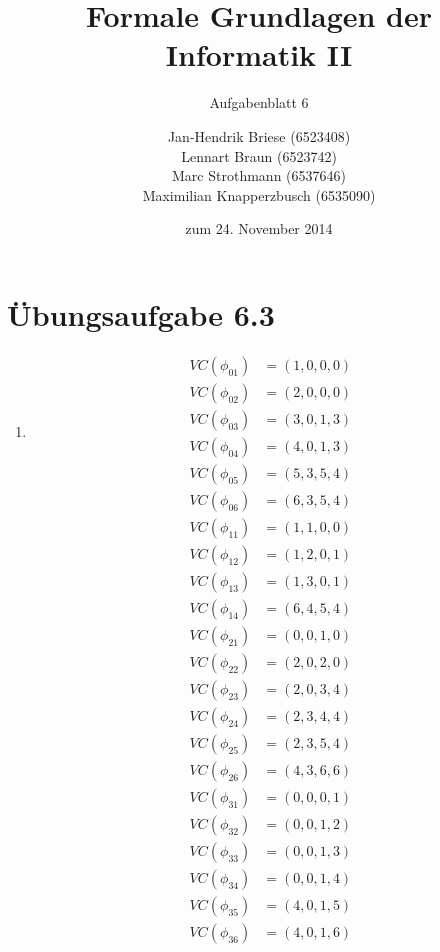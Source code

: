 \documentclass[a4paper]{scrartcl}
\title{Formale Grundlagen der Informatik II}
\subtitle{Aufgabenblatt 6}
\author{
    Jan-Hendrik Briese (6523408) \\
    Lennart Braun (6523742) \\
    Marc Strothmann (6537646) \\
    Maximilian Knapperzbusch (6535090)
}
\date{zum 24. November 2014}
\begin{document}
\maketitle

\section*{Übungsaufgabe 6.3} 
\begin{enumerate}
    \item
        \begin{align*}
            VC(\phi_{01}) &= (1, 0, 0, 0) \\
            VC(\phi_{02}) &= (2, 0, 0, 0) \\
            VC(\phi_{03}) &= (3, 0, 1, 3) \\
            VC(\phi_{04}) &= (4, 0, 1, 3) \\
            VC(\phi_{05}) &= (5, 3, 5, 4) \\
            VC(\phi_{06}) &= (6, 3, 5, 4)
        \end{align*}
        \begin{align*}
            VC(\phi_{11}) &= (1, 1, 0, 0) \\
            VC(\phi_{12}) &= (1, 2, 0, 1) \\
            VC(\phi_{13}) &= (1, 3, 0, 1) \\
            VC(\phi_{14}) &= (6, 4, 5, 4)
        \end{align*}
        \begin{align*}
            VC(\phi_{21}) &= (0, 0, 1, 0) \\
            VC(\phi_{22}) &= (2, 0, 2, 0) \\
            VC(\phi_{23}) &= (2, 0, 3, 4) \\
            VC(\phi_{24}) &= (2, 3, 4, 4) \\
            VC(\phi_{25}) &= (2, 3, 5, 4) \\
            VC(\phi_{26}) &= (4, 3, 6, 6)
        \end{align*}
        \begin{align*}
            VC(\phi_{31}) &= (0, 0, 0, 1) \\
            VC(\phi_{32}) &= (0, 0, 1, 2) \\
            VC(\phi_{33}) &= (0, 0, 1, 3) \\
            VC(\phi_{34}) &= (0, 0, 1, 4) \\
            VC(\phi_{35}) &= (4, 0, 1, 5) \\
            VC(\phi_{36}) &= (4, 0, 1, 6)
        \end{align*}


\end{enumerate}
\end{document}
